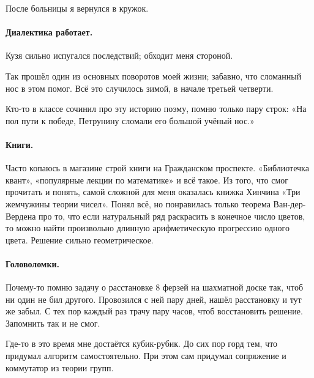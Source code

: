 \documentclass{book}
\begin{document}
После больницы я вернулся в кружок.

\paragraph{Диалектика работает.}
Кузя сильно испугался последствий; обходит меня стороной.

Так прошёл один из основных поворотов моей жизни;
забавно, что сломанный нос в этом помог.
Всё это случилось зимой, в начале третьей четверти.

Кто-то в классе сочинил про эту историю поэму, помню только пару строк: 
«На пол пути к победе, Петрунину сломали его большой учёный нос.»

\paragraph{Книги.}
Часто копаюсь в магазине строй книги на Гражданском проспекте.
«Библиотечка квант», «популярные лекции по математике» и всё такое.
Из того, что смог прочитать и понять, 
самой сложной для меня оказалась книжка Хинчина «Три жемчужины теории чисел».
Понял всё, но понравилась только теорема Ван-дер-Вердена про то, что если натуральный ряд раскрасить в конечное число цветов, то можно найти произвольно длинную арифметическую прогрессию одного цвета.
Решение сильно геометрическое.


\paragraph{Головоломки.}
Почему-то помню задачу о расстановке 8 ферзей на шахматной доске так, чтоб ни один не бил другого.
Провозился с ней пару дней, нашёл расстановку и тут же забыл.
С тех пор каждый раз трачу пару часов, чтоб восстановить решение. 
Запомнить так и не смог.

Где-то в это время мне достаётся кубик-рубик.
До сих пор горд тем, что придумал алгоритм самостоятельно.
При этом сам придумал сопряжение и коммутатор из теории групп.
\end{document}
